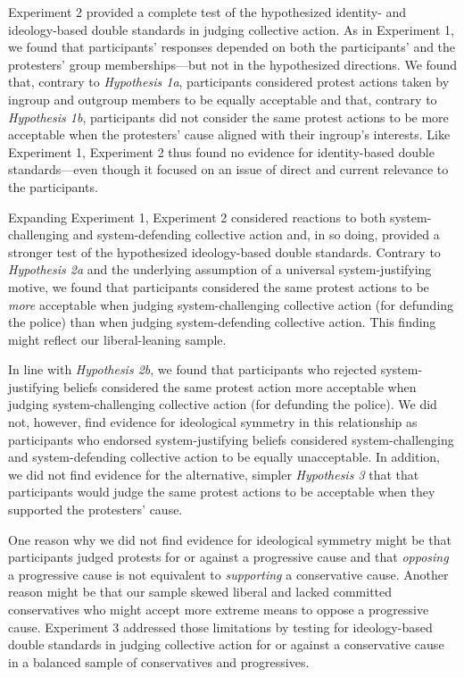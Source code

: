 \documentclass[12pt, letterpaper]{article}
\begin{document}
Experiment 2 provided a complete test of the hypothesized identity- and
ideology-based double standards in judging collective action. As in
Experiment 1, we found that participants' responses depended on both the
participants' and the protesters' group memberships---but not in the
hypothesized directions. We found that, contrary to \emph{Hypothesis
1a}, participants considered protest actions taken by ingroup and
outgroup members to be equally acceptable and that, contrary to
\emph{Hypothesis 1b}, participants did not consider the same protest
actions to be more acceptable when the protesters' cause aligned with
their ingroup's interests. Like Experiment 1, Experiment 2 thus found no
evidence for identity-based double standards---even though it focused on
an issue of direct and current relevance to the participants.

Expanding Experiment 1, Experiment 2 considered reactions to both
system-challenging and system-defending collective action and, in so
doing, provided a stronger test of the hypothesized ideology-based
double standards. Contrary to \emph{Hypothesis 2a} and the underlying
assumption of a universal system-justifying motive, we found that
participants considered the same protest actions to be \emph{more}
acceptable when judging system-challenging collective action (for
defunding the police) than when judging system-defending collective
action. This finding might reflect our liberal-leaning sample.

In line with \emph{Hypothesis 2b}, we found that participants who
rejected system-justifying beliefs considered the same protest action
more acceptable when judging system-challenging collective action (for
defunding the police). We did not, however, find evidence for
ideological symmetry in this relationship as participants who endorsed
system-justifying beliefs considered system-challenging and
system-defending collective action to be equally unacceptable. In
addition, we did not find evidence for the alternative, simpler
\emph{Hypothesis 3} that that participants would judge the same protest
actions to be acceptable when they supported the protesters' cause.

One reason why we did not find evidence for ideological symmetry might
be that participants judged protests for or against a progressive cause
and that \emph{opposing} a progressive cause is not equivalent to
\emph{supporting} a conservative cause. Another reason might be that our
sample skewed liberal and lacked committed conservatives who might
accept more extreme means to oppose a progressive cause. Experiment 3
addressed those limitations by testing for ideology-based double
standards in judging collective action for or against a conservative
cause in a balanced sample of conservatives and progressives.
\end{document}
